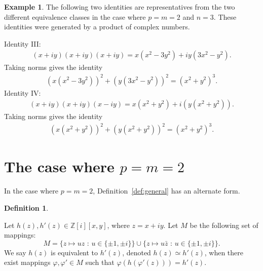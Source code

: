 \documentclass[12pt,table]{article}
\theoremstyle{definition}
\newtheorem{definition}[theorem]{Definition}
\newtheorem{example}[theorem]{Example}
\theoremstyle{remark}
\newcommand{\Zzz}{\mathbb Z}
\numberwithin{equation}{section}
\begin{document}
\begin{example}
The following two identities are representatives from 
the two different equivalence classes in the
case where $ p = m = 2 $ and $ n = 3$.
These identities
were generated by a product of complex numbers. 

\noindent
Identity III:
\begin{align*}
    (x + iy)(x + iy)(x + iy) 
    = x(x^2 - 3y^2) + i  y(3x^2 - y^2)  . 
    \end{align*}
Taking norms gives the identity
    \begin{align}
    (x(x^2 - 3y^2))^2 + (  y(3x^2 - y^2) )^2  
    = (x^2 + y^2)^3.
    \end{align}
Identity IV:
    \begin{align*}
    (x + iy )(x + iy)(x - iy ) 
    = x(x^2 + y^2 ) + i(y(x^2 + y^2))  .
    \end{align*}
Taking norms gives the identity
    \begin{align}
    ( x(x^2 + y^2) )^2 + ( y(x^2 + y^2) )^2 
    = (x^2 + y^2 )^3.
    \end{align}
\end{example}







\section{The case where $ p = m = 2$}


In the case where $ p = m = 2$, Definition~\ref{def:general} has an alternate form.



\begin{definition}
\label{def:2D}

Let $ h(z), h'(z) \in \Zzz [i][x,y] $,
where $ z = x + iy $.
Let $ M $ be the following set of mappings: 
\[
M = \{ z \mapsto uz \text{ : } u \in \{ \pm 1, \pm i \} \}  
\cup \{ z\mapsto u \bar{z} \text{ : } u \in \{ \pm 1, \pm i \} \}.  
\]
We say $ h(z) $ is equivalent to $ h'(z) $,
denoted $ h(z) \simeq h'(z) $,
when there exist mappings $ \varphi, \varphi' \in M $
such that $ \varphi( h( \varphi'( z ) ) )  = h'(z) $.



\end{definition}
\end{document}
